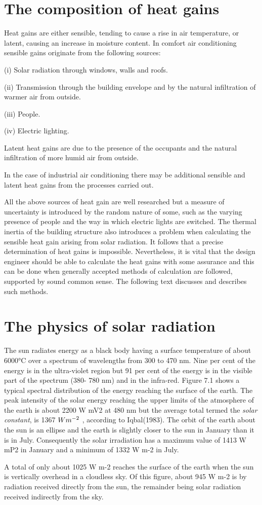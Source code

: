 \section{The composition of heat gains}

Heat gains are either sensible, tending to cause a rise in air temperature, or latent, causing
an increase in moisture content. In comfort air conditioning sensible gains originate from
the following sources:

(i) Solar radiation through windows, walls and roofs.

(ii) Transmission through the building envelope and by the natural infiltration of warmer
air from outside.

(iii) People.

(iv) Electric lighting.


Latent heat gains are due to the presence of the occupants and the natural infiltration of
more humid air from outside.

In the case of industrial air conditioning there may be additional sensible and latent heat
gains from the processes carried out.

All the above sources of heat gain are well researched but a measure of uncertainty is
introduced by the random nature of some, such as the varying presence of people and the
way in which electric lights are switched. The thermal inertia of the building structure also
introduces a problem when calculating the sensible heat gain arising from solar radiation.
It follows that a precise determination of heat gains is impossible. Nevertheless, it is vital
that the design engineer should be able to calculate the heat gains with some assurance and
this can be done when generally accepted methods of calculation are followed, supported
by sound common sense. The following text discusses and describes such methods.


\section{The physics of solar radiation}

The sun radiates energy as a black body having a surface temperature of about 6000°C
over a spectrum of wavelengths from 300 to 470 nm. Nine per cent of the energy is in the
ultra-violet region but 91 per cent of the energy is in the visible part of the spectrum (380-
780 nm) and in the infra-red. Figure 7.1 shows a typical spectral distribution of the energy
reaching the surface of the earth. The peak intensity of the solar energy reaching the upper
limits of the atmosphere of the earth is about 2200 W mV2 at 480 nm but the average total
termed the \emph{solar constant}, is 1367  $W\/  m^{-2}$ , according to Iqbal(1983). The orbit of the earth
about the sun is an ellipse and the earth is slightly closer to the sun in January than it is in
July. Consequently the solar irradiation  has a maximum value of 1413 W mP2 in January
and a minimum of 1332 W m-2 in July.

A total of only about 1025 W m-2 reaches the surface of the earth when the sun is
vertically overhead in a cloudless sky. Of this figure, about 945 W m-2  is by radiation
received directly from the sun, the remainder being solar radiation received indirectly from
the sky.